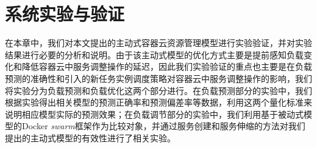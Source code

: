 
\chapter{系统实验与验证}\label{chap:sys_eval}
在本章中，我们对本文提出的主动式容器云资源管理模型进行实验验证，并对实验结果进行必要的分析和说明。由于该主动式模型的优化方式主要是提前感知负载变化和降低容器云中服务调整操作的延迟，因此我们实验验证的重点也主要是在负载预测的准确性和引入的新任务实例调度策略对容器云中服务调整操作的影响，我们将实验分为负载预测和负载优化这两个部分进行。在负载预测部分的实验中，我们根据实验得出相关模型的预测正确率和预测偏差率等数据，利用这两个量化标准来说明相应模型实际的预测效果；在负载调节部分的实验中，我们利用基于被动式模型的Docker \emph{swarm}框架作为比较对象，并通过服务创建和服务伸缩的方法对我们提出的主动式模型的有效性进行了相关实验。

